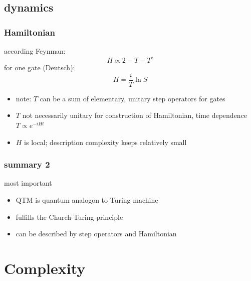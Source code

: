 \documentclass{beamer}
\begin{document}
\subsection{dynamics}
\begin{frame}
	\frametitle{Hamiltonian}
    according Feynman:
    \begin{equation}
        H\propto 2-T-T^\dagger
    \end{equation}
    for one gate (Deutsch):
    \begin{equation}
        H=\frac{i}{T}\ln S
    \end{equation}
    \begin{itemize}
		\item note: $T$ can be a sum of elementary, unitary step operators for gates
		\item $T$ not necessarily unitary for construction of Hamiltonian, time dependence $T\propto e^{-iHt}$
		\item $H$ is local; description complexity keeps relatively small
    \end{itemize}
\end{frame}
%
\begin{frame}
	\frametitle{summary 2}
	\begin{block}{most important}
		\begin{itemize}
			\item QTM is quantum analogon to Turing machine
			\item fulfills the Church-Turing principle
			\item can be described by step operators and Hamiltonian
		\end{itemize}
	\end{block}
\end{frame}
%
%
\section{Complexity}
%
\end{document}
